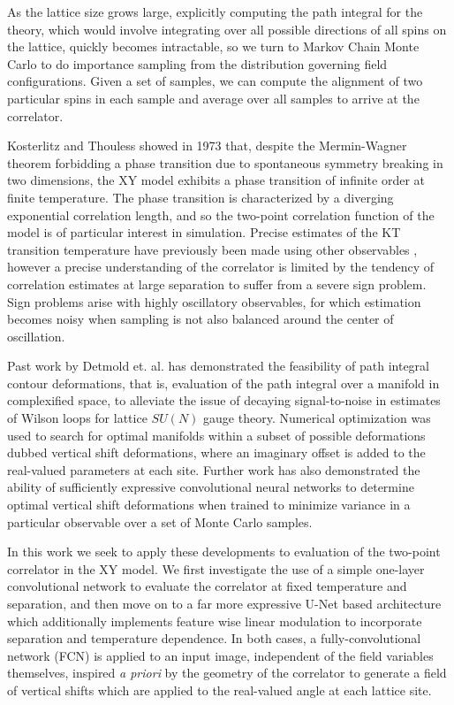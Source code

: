 \documentclass[12pt]{article}
\begin{document}
As the lattice size grows large, explicitly computing the path integral for the theory, which would involve integrating over all possible directions of all spins on the lattice,
quickly becomes intractable, so we turn to Markov Chain Monte Carlo to do importance sampling from the distribution governing field configurations. Given a set of samples, we can compute the alignment of two
particular spins in each sample and average over all samples to arrive at the correlator.

Kosterlitz and Thouless \cite{KT} showed in 1973 that, despite the Mermin-Wagner theorem forbidding a phase transition due to spontaneous symmetry breaking
in two dimensions, the XY model exhibits a phase transition of infinite order at finite temperature. The phase transition is characterized by a diverging
exponential correlation length, and so the two-point correlation function of the model is of particular interest in simulation. Precise estimates of the KT transition
temperature have previously been made using other observables \cite{Hasenbusch_2005}, however a precise understanding of the correlator is limited by
the tendency of correlation estimates at large separation to suffer from a severe sign problem. Sign problems arise with highly oscillatory observables, for which
estimation becomes noisy when sampling is not also balanced around the center of oscillation.

Past work by Detmold et. al. \cite{Detmold_2021} has demonstrated the feasibility of path integral contour deformations, that is, evaluation
of the path integral over a manifold in complexified space, to alleviate the issue of decaying signal-to-noise in estimates of Wilson loops for lattice $SU(N)$ gauge theory.
Numerical optimization was used to search for optimal manifolds within a subset of possible deformations dubbed vertical shift deformations, where an imaginary offset is added to the
real-valued parameters at each site. Further work \cite{detmold2023signaltonoiseimprovementneuralnetwork} has also demonstrated the ability of sufficiently expressive convolutional neural networks
to determine optimal vertical shift deformations when trained to minimize variance in a particular observable over a set of Monte Carlo samples.

In this work we seek to apply these developments to evaluation of the two-point correlator in the XY model. We first investigate the use of a simple one-layer
convolutional network to evaluate the correlator at fixed temperature and separation, and then move on to a far more expressive U-Net \cite{ronneberger2015unetconvolutionalnetworksbiomedical}
based architecture which additionally implements feature wise linear modulation \cite{perez2017filmvisualreasoninggeneral} to incorporate separation and temperature dependence. In both cases,
a fully-convolutional network (FCN) is applied to an input image, independent of the field variables themselves, inspired \textit{a priori} by the geometry of the correlator to generate a field of vertical shifts which are applied to
the real-valued angle at each lattice site.
\end{document}
